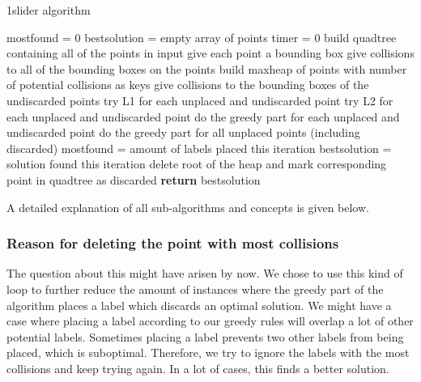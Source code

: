 \documentclass[crop=false,a4paper,oneside,11pt]{article}
\begin{document}
 \begin{algorithm}[H]
\caption{1slider algorithm}
\begin{algorithmic}[1]
\State mostfound = 0
\State bestsolution = empty array of points
\State timer = 0
\State build quadtree containing all of the points in input
\State give each point a bounding box
\State give collisions to all of the bounding boxes on the points
\State build maxheap of points with number of potential collisions as keys
\State give collisions to the bounding boxes of the undiscarded points
\State try L1 for each unplaced and undiscarded point
\State try L2 for each unplaced and undiscarded point
\State do the greedy part for each unplaced and undiscarded point
\State do the greedy part for all unplaced points (including discarded)
\State mostfound = amount of labels placed this iteration
\State bestsolution = solution found this iteration
\EndIf
\State delete root of the heap and mark corresponding point in quadtree as discarded
\EndWhile
\State \textbf{return} bestsolution
\EndProcedure
\end{algorithmic}
\end{algorithm} 
A detailed explanation of all sub-algorithms and concepts is given below. 

\subsubsection{Reason for deleting the point with most collisions}
The question about this might have arisen by now. We chose to use this kind of loop to further reduce the amount of instances where the greedy part of the algorithm places a label which discards an optimal solution. We might have a case where placing a label according to our greedy rules will overlap a lot of other potential labels. Sometimes placing a label prevents two other labels from being placed, which is suboptimal. Therefore, we try to ignore the labels with the most collisions and keep trying again. In a lot of cases, this finds a better solution.
\end{document}
